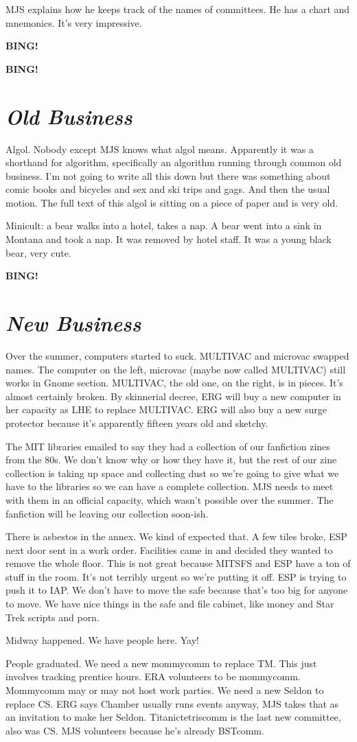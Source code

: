 \documentclass[10pt]{article}
\newcommand{\bing}{{\bf BING!} }
\newcommand{\goto}[1]{\bing \vskip 12pt \section*{{\em{#1}}}}
\begin{document}
MJS explains how he keeps track of the names of committees. He has a chart and mnemonics. It's very impressive.

\bing

\goto{Old Business}

Algol. Nobody except MJS knows what algol means. Apparently it was a shorthand for algorithm, specifically an algorithm running through common old business. I'm not going to write all this down but there was something about comic books and bicycles and sex and ski trips and gags. And then the usual motion. The full text of this algol is sitting on a piece of paper and is very old. 

Minicult: a bear walks into a hotel, takes a nap. A bear went into a sink in Montana and took a nap. It was removed by hotel staff. It was a young black bear, very cute. 

\goto{New Business}

Over the summer, computers started to suck. MULTIVAC and microvac swapped names. The computer on the left, microvac (maybe now called MULTIVAC) still works in Gnome section. MULTIVAC, the old one, on the right, is in pieces. It's almost certainly broken. By skinnerial decree, ERG will buy a new computer in her capacity as LHE to replace MULTIVAC. ERG will also buy a new surge protector because it's apparently fifteen years old and sketchy.

The MIT libraries emailed to say they had a collection of our fanfiction zines from the 80s. We don't know why or how they have it, but the rest of our zine collection is taking up space and collecting dust so we're going to give what we have to the libraries so we can have a complete collection. MJS needs to meet with them in an official capacity, which wasn't possible over the summer. The fanfiction will be leaving our collection soon-ish.

There is asbestos in the annex. We kind of expected that. A few tiles broke, ESP next door sent in a work order. Facilities came in and decided they wanted to remove the whole floor. This is not great because MITSFS and ESP have a ton of stuff in the room. It's not terribly urgent so we're putting it off. ESP is trying to push it to IAP. We don't have to move the safe because that's too big for anyone to move. We have nice things in the safe and file cabinet, like money and Star Trek scripts and porn.

Midway happened. We have people here. Yay!

People graduated. We need a new mommycomm to replace TM. This just involves tracking prentice hours. ERA volunteers to be mommycomm. Mommycomm may or may not host work parties. We need a new Seldon to replace CS. ERG says Chamber usually runs events anyway, MJS takes that as an invitation to make her Seldon. Titanictetriscomm is the last new committee, also was CS. MJS volunteers because he's already BSTcomm.
\end{document}
